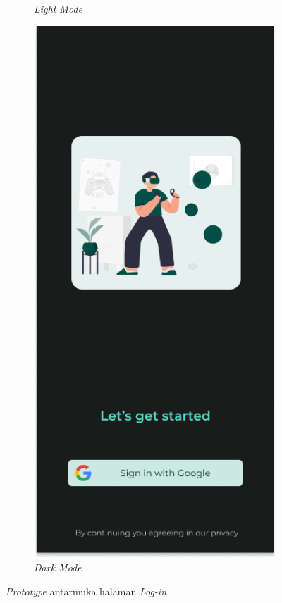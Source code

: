 \begin{figure}[H]
\begin{subfigure}[b]{0.23\textwidth}
	  \caption{\textit{Light Mode}}
	  \label{fig:HasilLogin}
	\end{subfigure}
	\begin{subfigure}[b]{0.23\textwidth}
		\centering
	  \includegraphics[width=\linewidth]{contents/chapter-3/images/HF-login-dt.png}
	  \caption{\textit{Dark Mode}}
	  \label{fig:HasilLogin2}
	\end{subfigure}
	\caption{\textit{Prototype} antarmuka halaman \textit{Log-in}}
	\label{Fig:HasilFeatureSetLogin}
\end{figure}
